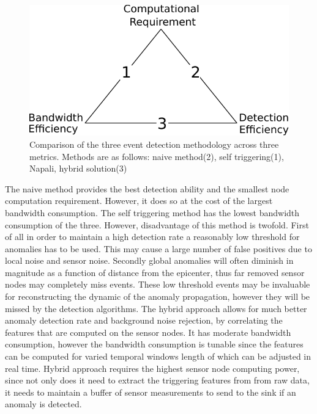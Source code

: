 \begin{figure}[h]
	  \centering
	  \includegraphics[width=0.5\linewidth]{img/edge_computing_vs.pdf}
	\caption{Comparison of the three event detection methodology across three metrics. Methods are as follows: naive method(2), self triggering(1), Napali, hybrid solution(3)}
	\label{intro:fig:edge}
\end{figure}
The naive method provides the best detection ability and the smallest node computation requirement. However, it does so at the cost of the largest bandwidth consumption. The self triggering method has the lowest bandwidth consumption of the three. However, disadvantage of this method is twofold. First of all in order to maintain a high detection rate a reasonably low threshold for anomalies has to be used. This may cause a large number of false positives due to local noise and sensor noise. Secondly global anomalies will often diminish in magnitude as a function of distance from the epicenter, thus far removed sensor nodes may completely miss events. These low threshold events may be invaluable for reconstructing the dynamic of the anomaly propagation, however they will be missed by the detection algorithms. The hybrid approach allows for much better anomaly detection rate and background noise rejection, by correlating the features that are computed on the sensor nodes. It has moderate bandwidth consumption, however the bandwidth consumption is tunable since the features can be computed for varied temporal windows length of which can be adjusted in real time. Hybrid approach requires the highest sensor node computing power, since not only does it need to extract the triggering features from from raw data, it needs to maintain a buffer of sensor measurements to send to the sink if an anomaly is detected.


